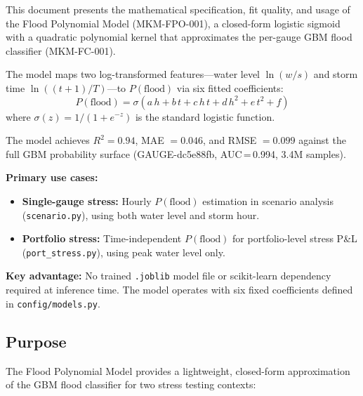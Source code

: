 \documentclass[11pt,a4paper]{article}
\begin{document}
\mkmtitlepage
\mkmlegalpage
\tableofcontents
\clearpage

\mkmexecsummary

This document presents the mathematical specification, fit quality, and usage of
the Flood Polynomial Model (MKM-FPO-001), a closed-form logistic sigmoid with a
quadratic polynomial kernel that approximates the per-gauge GBM flood classifier
(MKM-FC-001).

The model maps two log-transformed features---water level $\ln(w/s)$ and storm
time $\ln((t{+}1)/T)$---to $P(\text{flood})$ via six fitted coefficients:
\[
P(\text{flood}) = \sigma\!\left(a\,h + b\,t + c\,h\,t + d\,h^2 + e\,t^2 + f\right)
\]
where $\sigma(z) = 1/(1 + e^{-z})$ is the standard logistic function.

The model achieves $R^2 = 0.94$, MAE $= 0.046$, and RMSE $= 0.099$ against the
full GBM probability surface (GAUGE-dc5e88fb, AUC\,=\,0.994, 3.4M samples).

\textbf{Primary use cases:}
\begin{itemize}[nosep]
    \item \textbf{Single-gauge stress:} Hourly $P(\text{flood})$ estimation in
          scenario analysis (\texttt{scenario.py}), using both water level and
          storm hour.
    \item \textbf{Portfolio stress:} Time-independent $P(\text{flood})$ for
          portfolio-level stress P\&L (\texttt{port\_stress.py}), using peak
          water level only.
\end{itemize}

\textbf{Key advantage:} No trained \texttt{.joblib} model file or scikit-learn
dependency required at inference time. The model operates with six fixed
coefficients defined in \texttt{config/models.py}.

\mkmpurpose

\subsection{Purpose}
The Flood Polynomial Model provides a lightweight, closed-form approximation of
the GBM flood classifier for two stress testing contexts:
\end{document}
